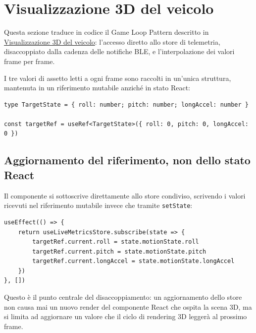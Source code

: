 \newpage

\section{Visualizzazione 3D del veicolo}

Questa sezione traduce in codice il Game Loop Pattern descritto in
\hyperref[sec:app-moto3d]{Visualizzazione 3D del veicolo}: l'accesso diretto
allo store di telemetria, disaccoppiato dalla cadenza delle notifiche BLE, e
l'interpolazione dei valori frame per frame.

I tre valori di assetto letti a ogni frame sono raccolti in un'unica
struttura, mantenuta in un riferimento mutabile anziché in stato React:

\begin{listing}[H]
\begin{verbatim}
type TargetState = { roll: number; pitch: number; longAccel: number }

const targetRef = useRef<TargetState>({ roll: 0, pitch: 0, longAccel: 0 })
\end{verbatim}
\caption{Stato di assetto mantenuto fuori dal ciclo di rendering React}
\label{listing:moto3d-targetstate}
\end{listing}

\subsection{Aggiornamento del riferimento, non dello stato React}
Il componente si sottoscrive direttamente allo store condiviso, scrivendo i
valori ricevuti nel riferimento mutabile invece che tramite \texttt{setState}:

\begin{listing}[H]
\begin{verbatim}
useEffect(() => {
    return useLiveMetricsStore.subscribe(state => {
        targetRef.current.roll = state.motionState.roll
        targetRef.current.pitch = state.motionState.pitch
        targetRef.current.longAccel = state.motionState.longAccel
    })
}, [])
\end{verbatim}
\caption{Sottoscrizione diretta allo store, senza passare da setState React}
\label{listing:moto3d-subscribe}
\end{listing}

Questo è il punto centrale del disaccoppiamento: un aggiornamento dello store
non causa mai un nuovo render del componente React che ospita la scena 3D,
ma si limita ad aggiornare un valore che il ciclo di rendering 3D leggerà al 
prossimo frame.
